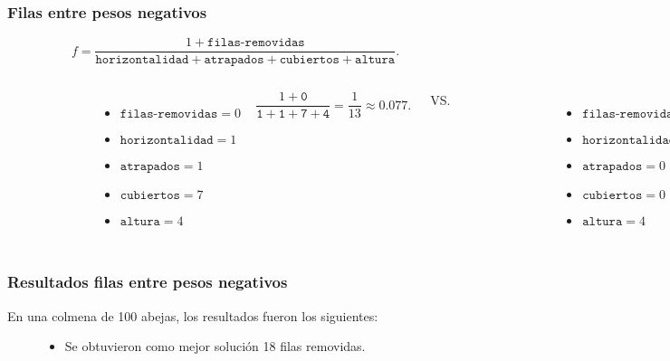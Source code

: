 \begin{frame}
\frametitle{Filas entre pesos negativos}
\begin{displaymath}
   f = \frac{1 + \texttt{filas-removidas}}{\texttt{horizontalidad} + \texttt{atrapados} + \texttt{cubiertos} + \texttt{altura}} .
\end{displaymath}
\pause 
\begin{columns}
\begin{figure}
\scalebox{.40}{}
\end{figure}
\begin{itemize}
\pause
\item $\texttt{filas-removidas} = 0$
\item $\texttt{horizontalidad} = 1$
\item $\texttt{atrapados} = 1$
\item $\texttt{cubiertos} = 7$
\item $\texttt{altura} = 4$ 
\end{itemize}
\begin{displaymath}
    \frac{1 + \texttt{0}}{\texttt{1} + \texttt{1} + \texttt{7} + \texttt{4}} = \frac{1}{13} \approx 0.077.
\end{displaymath}
\pause
{}
\begin{center}
VS.
\end{center}
\begin{figure}
\scalebox{.40}{}
\end{figure}
\begin{itemize}
\pause
\item $\texttt{filas-removidas} = 2$
\item $\texttt{horizontalidad} = 1$
\item $\texttt{atrapados} = 0$
\item $\texttt{cubiertos} = 0$
\item $\texttt{altura} = 4$ 
\end{itemize}
\begin{displaymath}
    \frac{1 + (2 \times c)}{1 + 0 + 0 + 1} = \frac{1 + 4}{2} = \frac{5}{2} = 2.5.
\end{displaymath}
\end{columns}

\end{frame}

\begin{frame}
\frametitle{Resultados filas entre pesos negativos}
En una colmena de 100 abejas, los resultados fueron los siguientes:
\begin{figure}
\scalebox{.7}{}
\pause
\begin{itemize}
\item Se obtuvieron como mejor solución 18 filas removidas.
\end{itemize}
\end{figure}
\end{frame}


